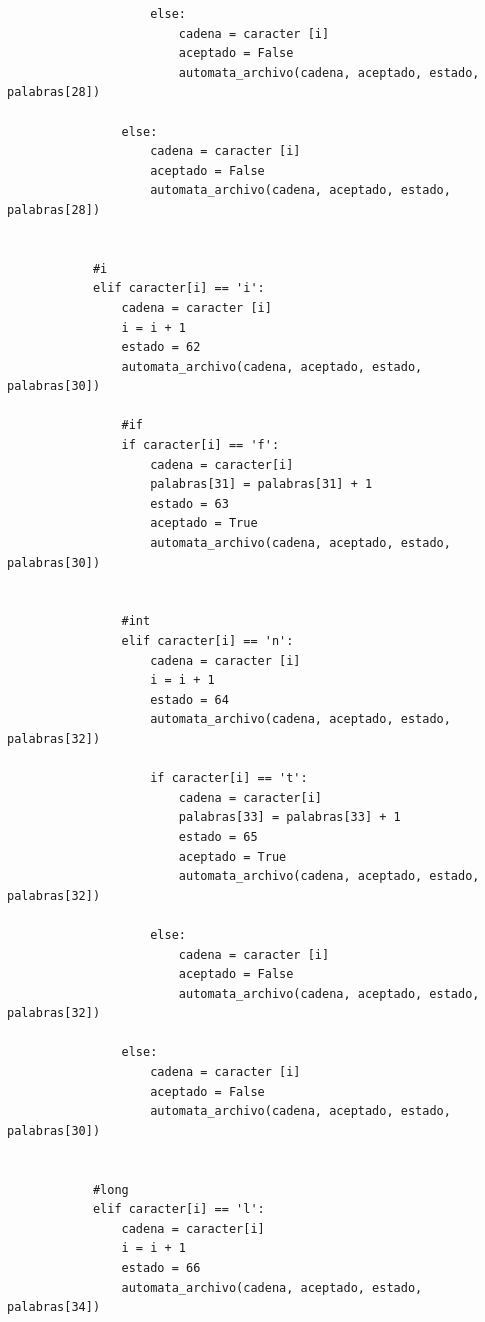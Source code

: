 \documentclass{article}
\begin{document}
\begin{flushleft}
\begin{lstlisting}
                    else:
                        cadena = caracter [i]
                        aceptado = False
                        automata_archivo(cadena, aceptado, estado, palabras[28])
                
                else:
                    cadena = caracter [i]
                    aceptado = False
                    automata_archivo(cadena, aceptado, estado, palabras[28])
                
                
            #i
            elif caracter[i] == 'i':
                cadena = caracter [i]
                i = i + 1
                estado = 62
                automata_archivo(cadena, aceptado, estado, palabras[30])
                        
                #if
                if caracter[i] == 'f':
                    cadena = caracter[i]
                    palabras[31] = palabras[31] + 1
                    estado = 63
                    aceptado = True
                    automata_archivo(cadena, aceptado, estado, palabras[30])
                    
                    
                #int
                elif caracter[i] == 'n':
                    cadena = caracter [i]
                    i = i + 1
                    estado = 64
                    automata_archivo(cadena, aceptado, estado, palabras[32])
                        
                    if caracter[i] == 't':
                        cadena = caracter[i]
                        palabras[33] = palabras[33] + 1
                        estado = 65
                        aceptado = True
                        automata_archivo(cadena, aceptado, estado, palabras[32])
                            
                    else:
                        cadena = caracter [i]
                        aceptado = False
                        automata_archivo(cadena, aceptado, estado, palabras[32])
                            
                else:
                    cadena = caracter [i]
                    aceptado = False
                    automata_archivo(cadena, aceptado, estado, palabras[30])
                            
                   
            #long
            elif caracter[i] == 'l':
                cadena = caracter[i]
                i = i + 1
                estado = 66
                automata_archivo(cadena, aceptado, estado, palabras[34])
                

\end{lstlisting}
\end{flushleft}
\end{document}
